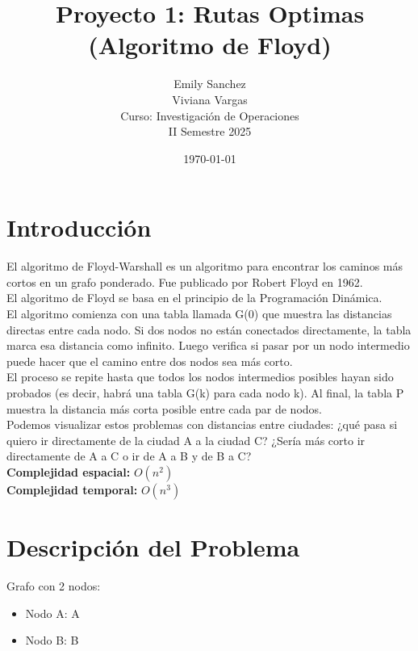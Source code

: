 \documentclass[12pt]{article}
\title{Proyecto 1: Rutas Optimas (Algoritmo de Floyd)}
\author{Emily Sanchez \\ Viviana Vargas \\[1cm] Curso: Investigación de Operaciones \\ II Semestre 2025}
\date{\today}
\begin{document}
\maketitle
\thispagestyle{empty}
\newpage
\setcounter{page}{1}

\section{Introducción}
El algoritmo de Floyd-Warshall es un algoritmo para encontrar los caminos más cortos en un grafo ponderado. Fue publicado por Robert Floyd en 1962.\\
El algoritmo de Floyd se basa en el principio de la Programación Dinámica.\\
El algoritmo comienza con una tabla llamada G(0) que muestra las distancias directas entre cada nodo. Si dos nodos no están conectados directamente, la tabla marca esa distancia como infinito. Luego verifica si pasar por un nodo intermedio puede hacer que el camino entre dos nodos sea más corto.\\
El proceso se repite hasta que todos los nodos intermedios posibles hayan sido probados (es decir, habrá una tabla G(k) para cada nodo k). Al final, la tabla P muestra la distancia más corta posible entre cada par de nodos.\\
Podemos visualizar estos problemas con distancias entre ciudades: ¿qué pasa si quiero ir directamente de la ciudad A a la ciudad C? ¿Sería más corto ir directamente de A a C o ir de A a B y de B a C?\\
\textbf{Complejidad espacial:} $O(n^2)$\\
\textbf{Complejidad temporal:} $O(n^3)$\\
\clearpage
\section{Descripción del Problema}
Grafo con 2 nodos:

\begin{itemize}
\item Nodo A: A
\item Nodo B: B
\end{itemize}
\end{document}
